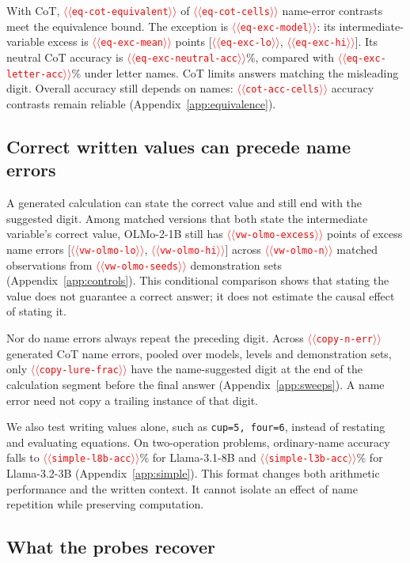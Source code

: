 \documentclass[11pt]{article}
\providecommand{\NUM}[1]{\textcolor{red}{$\langle\langle$\texttt{#1}$\rangle\rangle$}}
\begin{document}
With CoT, \NUM{eq-cot-equivalent} of \NUM{eq-cot-cells} name-error contrasts meet the equivalence
bound. The exception is \NUM{eq-exc-model}: its intermediate-variable excess is
\NUM{eq-exc-mean} points [\NUM{eq-exc-lo}, \NUM{eq-exc-hi}]. Its neutral CoT accuracy is
\NUM{eq-exc-neutral-acc}\%, compared with \NUM{eq-exc-letter-acc}\% under letter names.
CoT limits answers matching the misleading digit. Overall accuracy still depends on names:
\NUM{cot-acc-cells} accuracy contrasts remain reliable
(Appendix~\ref{app:equivalence}).





\subsection{Correct written values can precede name errors}
\label{sec:written-controls}

A generated calculation can state the correct value and still end with the suggested
digit. Among matched versions that both state the intermediate variable's correct value,
OLMo-2-1B still has \NUM{vw-olmo-excess} points of excess name errors
[\NUM{vw-olmo-lo}, \NUM{vw-olmo-hi}] across \NUM{vw-olmo-n} matched observations from
\NUM{vw-olmo-seeds} demonstration sets (Appendix~\ref{app:controls}). This conditional
comparison shows that stating the value does not guarantee a correct answer; it does
not estimate the causal effect of stating it.

Nor do name errors always repeat the preceding digit. Across \NUM{copy-n-err} generated
CoT name errors, pooled over models, levels and demonstration sets, only
\NUM{copy-lure-frac} have the name-suggested digit at the end of the calculation segment
before the final answer (Appendix~\ref{app:sweeps}). A name error need not copy a trailing
instance of that digit.

We also test writing values alone, such as \texttt{cup=5, four=6}, instead of restating
and evaluating equations. On two-operation problems, ordinary-name accuracy falls to
\NUM{simple-l8b-acc}\% for Llama-3.1-8B and \NUM{simple-l3b-acc}\% for Llama-3.2-3B
(Appendix~\ref{app:simple}). This format changes both arithmetic performance and the
written context. It cannot isolate an effect of name repetition while preserving computation.

\subsection{What the probes recover}
\end{document}
